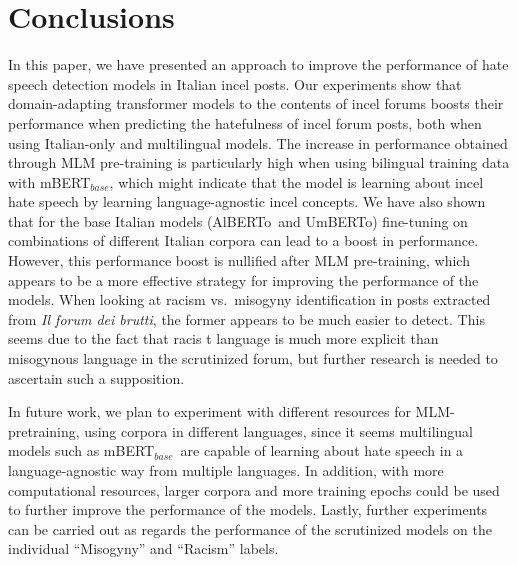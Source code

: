 \documentclass[11pt]{article}
\newcommand{\abc}[1]{{\color{blue} #1}}
\newcommand{\todoP}[1]{\todo[color=red]{P: #1}}
\newcommand{\mbert}{\mbox{mBERT$_{base}$}}
\newcommand{\umbert}{\mbox{UmBERTo}}
\newcommand{\albert}{\mbox{AlBERTo}}
\newcommand{\itforum}{\textit{Il forum dei brutti}}
\begin{document}
\section{Conclusions}
\label{sec:conclusions}

In this paper, we have presented an approach to improve the performance of hate speech detection models in Italian incel posts. %
%
Our experiments show that domain-adapting transformer models to the contents of incel forums boosts their performance when predicting the hatefulness of incel forum posts, both when using Italian-only and multilingual models. The increase in performance obtained through MLM pre-training is particularly high when using bilingual training data with \mbert, which might indicate that the model is learning about incel hate speech by learning language-agnostic incel concepts.
We have also shown that for the base Italian models (\albert\, and \umbert) fine-tuning on combinations of different Italian corpora can lead to a boost in performance. However, this performance boost is nullified after MLM pre-training, which appears to be a more effective strategy for improving the performance of the models. When looking at racism vs.\ misogyny identification in posts extracted from \itforum, the former appears to be much easier to detect. This seems due to the fact that racis\abc{t language} is much more explicit than misogynous language in the scrutinized forum, but further research is needed to ascertain such a supposition.

In future work, we plan to experiment with different resources for MLM-pretraining, using corpora in different languages, since it seems multilingual models such as \mbert\, are capable of learning about hate speech in a language-agnostic way from multiple languages. In addition, with more computational resources, larger corpora and more training epochs could be used to further improve the performance of the models. Lastly, further experiments can be carried out as regards the performance of the scrutinized models on the individual ``Misogyny'' and ``Racism'' labels.

\end{document}
